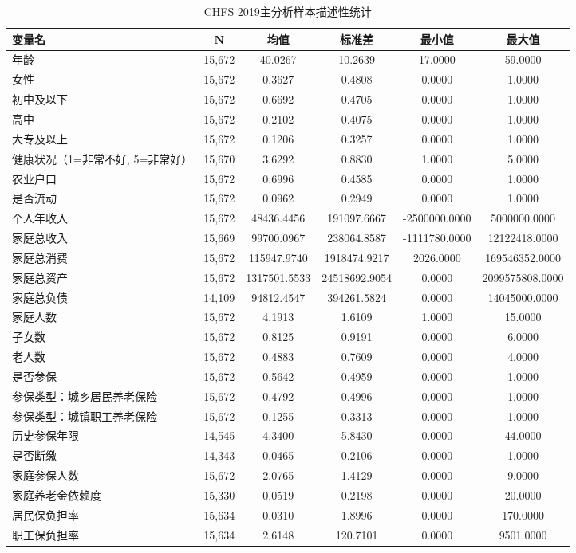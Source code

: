 \begin{table}[htbp]
\centering
\small
\caption{CHFS 2019主分析样本描述性统计}
\label{tab:descriptive_statistics}
\begin{tabular}{lccccc}
\hline
变量名 & N & 均值 & 标准差 & 最小值 & 最大值 \\
\hline
年龄 & 15,672 & 40.0267 & 10.2639 & 17.0000 & 59.0000 \\
女性 & 15,672 & 0.3627 & 0.4808 & 0.0000 & 1.0000 \\
初中及以下 & 15,672 & 0.6692 & 0.4705 & 0.0000 & 1.0000 \\
高中 & 15,672 & 0.2102 & 0.4075 & 0.0000 & 1.0000 \\
大专及以上 & 15,672 & 0.1206 & 0.3257 & 0.0000 & 1.0000 \\
健康状况（1=非常不好, 5=非常好） & 15,670 & 3.6292 & 0.8830 & 1.0000 & 5.0000 \\
农业户口 & 15,672 & 0.6996 & 0.4585 & 0.0000 & 1.0000 \\
是否流动 & 15,672 & 0.0962 & 0.2949 & 0.0000 & 1.0000 \\
个人年收入 & 15,672 & 48436.4456 & 191097.6667 & -2500000.0000 & 5000000.0000 \\
家庭总收入 & 15,669 & 99700.0967 & 238064.8587 & -1111780.0000 & 12122418.0000 \\
家庭总消费 & 15,672 & 115947.9740 & 1918474.9217 & 2026.0000 & 169546352.0000 \\
家庭总资产 & 15,672 & 1317501.5533 & 24518692.9054 & 0.0000 & 2099575808.0000 \\
家庭总负债 & 14,109 & 94812.4547 & 394261.5824 & 0.0000 & 14045000.0000 \\
家庭人数 & 15,672 & 4.1913 & 1.6109 & 1.0000 & 15.0000 \\
子女数 & 15,672 & 0.8125 & 0.9191 & 0.0000 & 6.0000 \\
老人数 & 15,672 & 0.4883 & 0.7609 & 0.0000 & 4.0000 \\
是否参保 & 15,672 & 0.5642 & 0.4959 & 0.0000 & 1.0000 \\
参保类型：城乡居民养老保险 & 15,672 & 0.4792 & 0.4996 & 0.0000 & 1.0000 \\
参保类型：城镇职工养老保险 & 15,672 & 0.1255 & 0.3313 & 0.0000 & 1.0000 \\
历史参保年限 & 14,545 & 4.3400 & 5.8430 & 0.0000 & 44.0000 \\
是否断缴 & 14,343 & 0.0465 & 0.2106 & 0.0000 & 1.0000 \\
家庭参保人数 & 15,672 & 2.0765 & 1.4129 & 0.0000 & 9.0000 \\
家庭养老金依赖度 & 15,330 & 0.0519 & 0.2198 & 0.0000 & 20.0000 \\
居民保负担率 & 15,634 & 0.0310 & 1.8996 & 0.0000 & 170.0000 \\
职工保负担率 & 15,634 & 2.6148 & 120.7101 & 0.0000 & 9501.0000 \\
\hline
\end{tabular}
\end{table}
